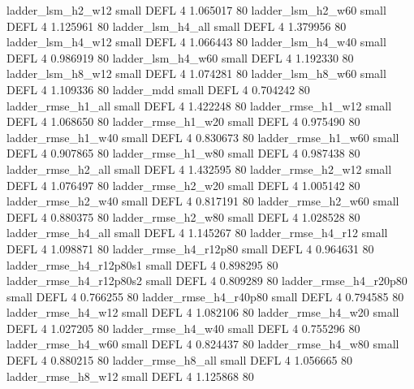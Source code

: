        ladder_lsm_h2_w12      small     DEFL                 4 1.065017 80
       ladder_lsm_h2_w60      small     DEFL                 4 1.125961 80
       ladder_lsm_h4_all      small     DEFL                 4 1.379956 80
       ladder_lsm_h4_w12      small     DEFL                 4 1.066443 80
       ladder_lsm_h4_w40      small     DEFL                 4 0.986919 80
       ladder_lsm_h4_w60      small     DEFL                 4 1.192330 80
       ladder_lsm_h8_w12      small     DEFL                 4 1.074281 80
       ladder_lsm_h8_w60      small     DEFL                 4 1.109336 80
              ladder_mdd      small     DEFL                 4 0.704242 80
      ladder_rmse_h1_all      small     DEFL                 4 1.422248 80
      ladder_rmse_h1_w12      small     DEFL                 4 1.068650 80
      ladder_rmse_h1_w20      small     DEFL                 4 0.975490 80
      ladder_rmse_h1_w40      small     DEFL                 4 0.830673 80
      ladder_rmse_h1_w60      small     DEFL                 4 0.907865 80
      ladder_rmse_h1_w80      small     DEFL                 4 0.987438 80
      ladder_rmse_h2_all      small     DEFL                 4 1.432595 80
      ladder_rmse_h2_w12      small     DEFL                 4 1.076497 80
      ladder_rmse_h2_w20      small     DEFL                 4 1.005142 80
      ladder_rmse_h2_w40      small     DEFL                 4 0.817191 80
      ladder_rmse_h2_w60      small     DEFL                 4 0.880375 80
      ladder_rmse_h2_w80      small     DEFL                 4 1.028528 80
      ladder_rmse_h4_all      small     DEFL                 4 1.145267 80
      ladder_rmse_h4_r12      small     DEFL                 4 1.098871 80
   ladder_rmse_h4_r12p80      small     DEFL                 4 0.964631 80
 ladder_rmse_h4_r12p80s1      small     DEFL                 4 0.898295 80
 ladder_rmse_h4_r12p80s2      small     DEFL                 4 0.809289 80
   ladder_rmse_h4_r20p80      small     DEFL                 4 0.766255 80
   ladder_rmse_h4_r40p80      small     DEFL                 4 0.794585 80
      ladder_rmse_h4_w12      small     DEFL                 4 1.082106 80
      ladder_rmse_h4_w20      small     DEFL                 4 1.027205 80
      ladder_rmse_h4_w40      small     DEFL                 4 0.755296 80
      ladder_rmse_h4_w60      small     DEFL                 4 0.824437 80
      ladder_rmse_h4_w80      small     DEFL                 4 0.880215 80
      ladder_rmse_h8_all      small     DEFL                 4 1.056665 80
      ladder_rmse_h8_w12      small     DEFL                 4 1.125868 80
